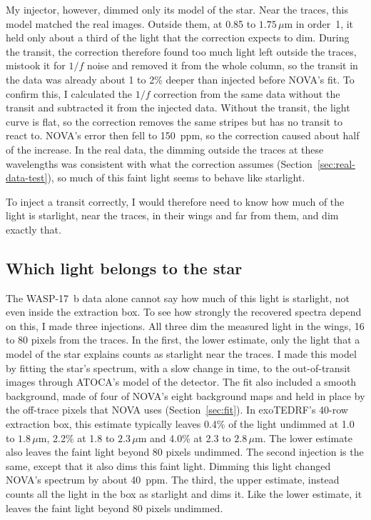 My injector, however, dimmed only its model of the star. Near the traces, this model matched the real images. Outside them, at 0.85 to $1.75\,\mu\mathrm{m}$ in order~1, it held only about a third of the light that the correction expects to dim. During the transit, the correction therefore found too
much light left outside the traces, mistook it for $1/f$ noise and removed it
from the whole column, so the transit in the data was already about 1 to 2\% deeper than injected before NOVA's fit. To
confirm this, I calculated the $1/f$ correction from the same data without
the transit and subtracted it from the injected data. Without the transit, the light curve is
flat, so the correction removes the same stripes but has no transit to react
to. NOVA's error then fell to 150~ppm, so the correction caused about half of the increase. In the real data, the dimming outside the traces at these wavelengths was consistent with what the correction assumes (Section~\ref{sec:real-data-test}), so much of this faint light seems to behave like starlight.

To inject a transit correctly, I would therefore need to know how much of the light is
starlight, near the traces, in their wings and far from them, and dim exactly
that.

\subsection{Which light belongs to the star}
\label{sec:which-light}

The WASP-17~b data alone cannot say how much of this light is starlight, not
even inside the extraction box. To see how strongly the recovered spectra depend on this, I made three
injections. All three dim the measured light in the wings, 16 to 80 pixels
from the traces. In the first, the lower estimate, only the light that a model of the star
explains counts as starlight near the traces. I made this model by fitting the
star's spectrum, with a slow change in time, to the out-of-transit images
through ATOCA's model of the detector. The fit also included a smooth
background, made of four of NOVA's eight background maps and held in place by
the off-trace pixels that NOVA uses (Section~\ref{sec:fit}). In exoTEDRF's 40-row extraction box, this estimate typically leaves 0.4\% of the light undimmed at 1.0 to $1.8\,\mu\mathrm{m}$, 2.2\% at 1.8 to $2.3\,\mu\mathrm{m}$ and 4.0\% at 2.3 to $2.8\,\mu\mathrm{m}$. The lower estimate also leaves the faint light beyond 80
pixels undimmed. The second injection is the same, except that it also dims
this faint light. Dimming this light changed NOVA's spectrum by about 40~ppm. The third, the upper
estimate, instead counts all the light in the box as starlight and dims it.
Like the lower estimate, it leaves the faint light beyond 80 pixels undimmed.

